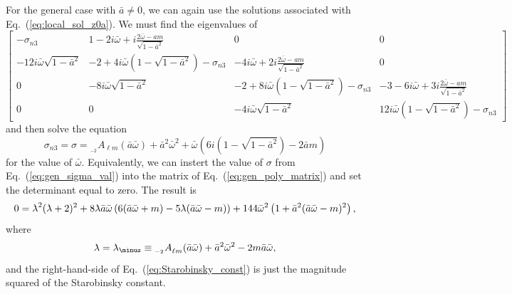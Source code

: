 \documentclass[11pt]{article}
\makeatletter
\newcommand{\scA}[4][]{{}_{{}_{#2}}A^{#1}_{#3}(#4)}
\def\lambdabar{\protect\@lambdabar}
\def\@lambdabar{%
\relax
\bgroup
\def\@tempa{\hbox{\raise.73\ht0
\hbox to0pt{\kern.25\wd0\vrule width.5\wd0
height.1pt depth.1pt\hss}\box0}}%
\mathchoice{\setbox0\hbox{$\displaystyle\lambda$}\@tempa}%
{\setbox0\hbox{$\textstyle\lambda$}\@tempa}%
{\setbox0\hbox{$\scriptstyle\lambda$}\@tempa}%
{\setbox0\hbox{$\scriptscriptstyle\lambda$}\@tempa}%
\egroup
}
\makeatother
\begin{document}
For the general case with $\bar{a}\ne0$, we can again use the
solutions associated with Eq.~(\ref{eq:local_sol_z0a}).  We must find
the eigenvalues of
\begin{equation}\label{eq:gen_poly_matrix}
  \left[\begin{array}{cccc}
    -\sigma_{n3} & 
    1-2i\bar\omega+i\frac{2\bar\omega-am}{\sqrt{1-\bar{a}^2}} &
    0 & 0 \\
    -12i\bar\omega\sqrt{1-\bar{a}^2} &
    -2 + 4i\bar\omega\left(1-\sqrt{1-\bar{a}^2}\right) - \sigma_{n3} &
    -4i\bar\omega + 2i\frac{2\bar\omega-am}{\sqrt{1-\bar{a}^2}} &
    0 \\
    0 & -8i\bar\omega\sqrt{1-\bar{a}^2} &
    -2 + 8i\bar\omega\left(1-\sqrt{1-\bar{a}^2}\right) - \sigma_{n3} &
    -3 - 6i\bar\omega + 3i\frac{2\bar\omega-am}{\sqrt{1-\bar{a}^2}} \\
    0 & 0 & -4i\bar\omega\sqrt{1-\bar{a}^2} &
    12i\bar\omega\left(1-\sqrt{1-\bar{a}^2}\right) - \sigma_{n3}
  \end{array}\right]
\end{equation}
and then solve the equation
\begin{equation}\label{eq:gen_sigma_val}
  \sigma_{n3}=\sigma = \scA{-2}{\ell{m}}{\bar{a}\bar\omega} 
    + \bar{a}^2\bar\omega^2 + \bar\omega\left(
       6i\left(1-\sqrt{1-\bar{a}^2}\right) - 2\bar{a}m\right)
\end{equation}
for the value of $\bar\omega$.  Equivalently, we can instert the value
of $\sigma$ from Eq.~(\ref{eq:gen_sigma_val}) into the matrix of
Eq.~(\ref{eq:gen_poly_matrix}) and set the determinant equal to zero.
The result is
\begin{equation}\label{eq:Starobinsky_const}
  0=\lambdabar^2(\lambdabar+2)^2 
  + 8\lambdabar\bar{a}\bar\omega\left(
      6(\bar{a}\bar\omega+m) -5\lambdabar(\bar{a}\bar\omega-m)\right)
      + 144\bar\omega^2\left(1+\bar{a}^2(\bar{a}\bar\omega-m)^2\right),
\end{equation}
where
\begin{equation}
  \lambdabar=\lambdabar_\minus\equiv \scA{-2}{\ell{m}}{\bar{a}\bar\omega}
     + \bar{a}^2\bar\omega^2 - 2m\bar{a}\bar\omega,
\end{equation}
and the right-hand-side of Eq.~(\ref{eq:Starobinsky_const}) is just the
magnitude squared of the Starobinsky constant.
\end{document}
